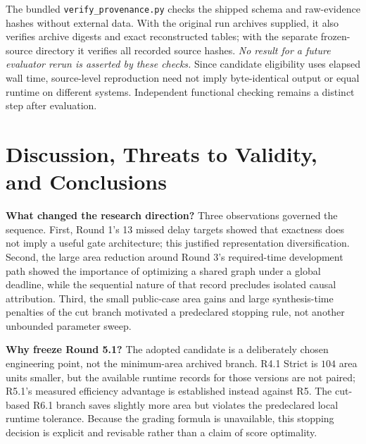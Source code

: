 \documentclass[journal,10pt]{IEEEtran}
\begin{document}
\noindent The bundled \texttt{verify\_provenance.py} checks the shipped schema and raw-evidence hashes without external data. With the original run archives supplied, it also verifies archive digests and exact reconstructed tables; with the separate frozen-source directory it verifies all recorded source hashes. \emph{No result for a future evaluator rerun is asserted by these checks.} Since candidate eligibility uses elapsed wall time, source-level reproduction need not imply byte-identical output or equal runtime on different systems. Independent functional checking remains a distinct step after evaluation.

\balance
\section{Discussion, Threats to Validity, and Conclusions}
\textbf{What changed the research direction?} Three observations governed the sequence. First, Round 1's 13 missed delay targets showed that exactness does not imply a useful gate architecture; this justified representation diversification. Second, the large area reduction around Round 3's required-time development path showed the importance of optimizing a shared graph under a global deadline, while the sequential nature of that record precludes isolated causal attribution. Third, the small public-case area gains and large synthesis-time penalties of the cut branch motivated a predeclared stopping rule, not another unbounded parameter sweep.

\textbf{Why freeze Round 5.1?} The adopted candidate is a deliberately chosen engineering point, not the minimum-area archived branch. R4.1 Strict is $104$ area units smaller, but the available runtime records for those versions are not paired; R5.1's measured efficiency advantage is established instead against R5. The cut-based R6.1 branch saves slightly more area but violates the predeclared local runtime tolerance. Because the grading formula is unavailable, this stopping decision is explicit and revisable rather than a claim of score optimality.
\end{document}

